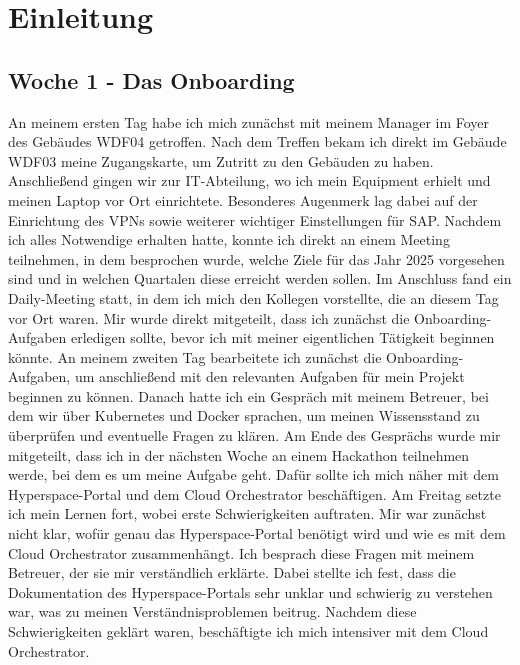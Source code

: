 %
%

\section{Einleitung}


\subsection{Woche 1 - Das Onboarding}
An meinem ersten Tag habe ich mich zunächst mit meinem Manager im Foyer des
Gebäudes WDF04 getroffen. Nach dem Treffen bekam ich direkt im Gebäude
WDF03 meine Zugangskarte, um Zutritt zu den Gebäuden zu haben. Anschließend
gingen wir zur IT-Abteilung, wo ich mein Equipment erhielt und meinen Laptop vor
Ort einrichtete. Besonderes Augenmerk lag dabei auf der Einrichtung des VPNs
sowie weiterer wichtiger Einstellungen für SAP.
Nachdem ich alles Notwendige erhalten hatte, konnte ich direkt an einem Meeting
teilnehmen, in dem besprochen wurde, welche Ziele für das Jahr 2025 vorgesehen
sind und in welchen Quartalen diese erreicht werden sollen. Im Anschluss fand ein
Daily-Meeting statt, in dem ich mich den Kollegen vorstellte, die an diesem Tag vor
Ort waren. Mir wurde direkt mitgeteilt, dass ich zunächst die Onboarding-Aufgaben
erledigen sollte, bevor ich mit meiner eigentlichen Tätigkeit beginnen könnte.
An meinem zweiten Tag bearbeitete ich zunächst die Onboarding-Aufgaben, um
anschließend mit den relevanten Aufgaben für mein Projekt beginnen zu können.
Danach hatte ich ein Gespräch mit meinem Betreuer, bei dem wir über Kubernetes
und Docker sprachen, um meinen Wissensstand zu überprüfen und eventuelle
Fragen zu klären. Am Ende des Gesprächs wurde mir mitgeteilt, dass ich in der
nächsten Woche an einem Hackathon teilnehmen werde, bei dem es um meine
Aufgabe geht. Dafür sollte ich mich näher mit dem Hyperspace-Portal und dem
Cloud Orchestrator beschäftigen.
Am Freitag setzte ich mein Lernen fort, wobei erste Schwierigkeiten auftraten. Mir
war zunächst nicht klar, wofür genau das Hyperspace-Portal benötigt wird und wie
es mit dem Cloud Orchestrator zusammenhängt. Ich besprach diese Fragen mit
meinem Betreuer, der sie mir verständlich erklärte. Dabei stellte ich fest, dass die
Dokumentation des Hyperspace-Portals sehr unklar und schwierig zu verstehen war,
was zu meinen Verständnisproblemen beitrug. Nachdem diese Schwierigkeiten
geklärt waren, beschäftigte ich mich intensiver mit dem Cloud Orchestrator.


